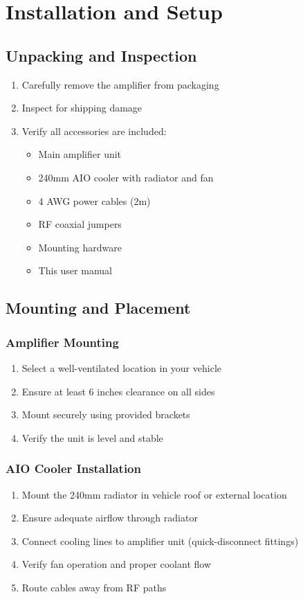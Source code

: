 \documentclass[11pt,a4paper]{article}
\begin{document}
\section{Installation and Setup}

\subsection{Unpacking and Inspection}
\begin{enumerate}
    \item Carefully remove the amplifier from packaging
    \item Inspect for shipping damage
    \item Verify all accessories are included:
    \begin{itemize}
        \item Main amplifier unit
        \item 240mm AIO cooler with radiator and fan
        \item 4 AWG power cables (2m)
        \item RF coaxial jumpers
        \item Mounting hardware
        \item This user manual
    \end{itemize}
\end{enumerate}

\subsection{Mounting and Placement}

\subsubsection{Amplifier Mounting}
\begin{enumerate}
    \item Select a well-ventilated location in your vehicle
    \item Ensure at least 6 inches clearance on all sides
    \item Mount securely using provided brackets
    \item Verify the unit is level and stable
\end{enumerate}

\subsubsection{AIO Cooler Installation}
\begin{enumerate}
    \item Mount the 240mm radiator in vehicle roof or external location
    \item Ensure adequate airflow through radiator
    \item Connect cooling lines to amplifier unit (quick-disconnect fittings)
    \item Verify fan operation and proper coolant flow
    \item Route cables away from RF paths
\end{enumerate}
\end{document}

